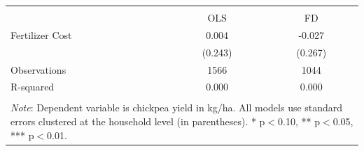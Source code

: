 \begin{tabular}{l*{2}{c}} 
\\[-1.8ex]\hline \hline \\[-1.8ex] 
& \multicolumn{1}{c}{OLS} & 
\multicolumn{1}{c}{FD} \\ \midrule
\midrule
Fertilizer Cost     &       0.004         &      -0.027         \\
                    &     (0.243)         &     (0.267)         \\
\midrule
Observations        &        1566         &        1044         \\
R-squared           &       0.000         &       0.000         \\
\hline \hline \\[-1.8ex] 
\multicolumn{3}{p{\linewidth}}{\small 
\noindent \textit{Note}: Dependent variable 
is chickpea yield in kg/ha. All models use 
standard errors clustered at the 
household level (in parentheses). 
* p$<$0.10, ** p$<$0.05, *** p$<$0.01.} 
\end{tabular}
